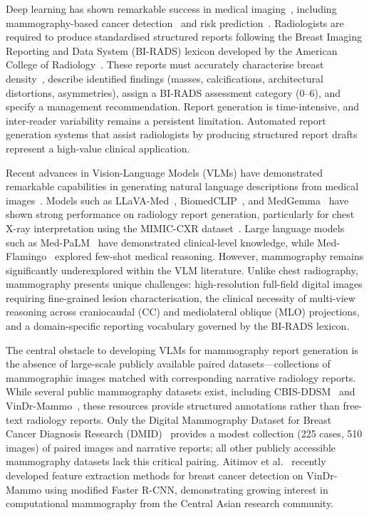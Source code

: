 \documentclass{wlscirep}
\begin{document}
Deep learning has shown remarkable success in medical imaging~\cite{esteva2019guide}, including mammography-based cancer detection~\cite{mckinney2020international, lotter2021robust, shen2019deep} and risk prediction~\cite{yala2019deep}. Radiologists are required to produce standardised structured reports following the Breast Imaging Reporting and Data System (BI-RADS) lexicon developed by the American College of Radiology~\cite{birads2013}. These reports must accurately characterise breast density~\cite{gastounioti2022breast, lehman2019mammographic}, describe identified findings (masses, calcifications, architectural distortions, asymmetries), assign a BI-RADS assessment category (0--6), and specify a management recommendation. Report generation is time-intensive, and inter-reader variability remains a persistent limitation. Automated report generation systems that assist radiologists by producing structured report drafts represent a high-value clinical application.

Recent advances in Vision-Language Models (VLMs) have demonstrated remarkable capabilities in generating natural language descriptions from medical images~\cite{wang2024mllm_survey}. Models such as LLaVA-Med~\cite{li2024llavamed}, BiomedCLIP~\cite{zhang2023biomedclip}, and MedGemma~\cite{lin2024medgemma} have shown strong performance on radiology report generation, particularly for chest X-ray interpretation using the MIMIC-CXR dataset~\cite{johnson2019mimiccxr}. Large language models such as Med-PaLM~\cite{singhal2023medpalm} have demonstrated clinical-level knowledge, while Med-Flamingo~\cite{moor2023medflamingo} explored few-shot medical reasoning. However, mammography remains significantly underexplored within the VLM literature. Unlike chest radiography, mammography presents unique challenges: high-resolution full-field digital images requiring fine-grained lesion characterisation, the clinical necessity of multi-view reasoning across craniocaudal (CC) and mediolateral oblique (MLO) projections, and a domain-specific reporting vocabulary governed by the BI-RADS lexicon.

The central obstacle to developing VLMs for mammography report generation is the absence of large-scale publicly available paired datasets---collections of mammographic images matched with corresponding narrative radiology reports. While several public mammography datasets exist, including CBIS-DDSM~\cite{lee2017curated} and VinDr-Mammo~\cite{nguyen2023vindr}, these resources provide structured annotations rather than free-text radiology reports. Only the Digital Mammography Dataset for Breast Cancer Diagnosis Research (DMID)~\cite{oza2024} provides a modest collection (225 cases, 510 images) of paired images and narrative reports; all other publicly accessible mammography datasets lack this critical pairing. Aitimov et al.~\cite{aitimov2025feature} recently developed feature extraction methods for breast cancer detection on VinDr-Mammo using modified Faster R-CNN, demonstrating growing interest in computational mammography from the Central Asian research community.
\end{document}

